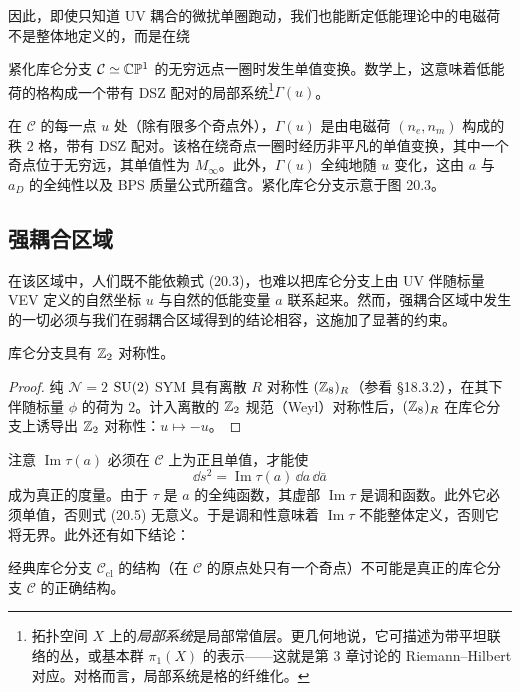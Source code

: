 因此，即使只知道 UV 耦合的微扰单圈跑动，我们也能断定低能理论中的电磁荷不是整体地定义的，而是在绕

紧化库仑分支 $\mathcal{C}\simeq\mathbb{C}\mathbb{P}^1$ 的无穷远点一圈时发生单值变换。数学上，这意味着低能荷的格构成一个带有 DSZ 配对的局部系统\footnote{拓扑空间 $X$ 上的\emph{局部系统}是局部常值层。更几何地说，它可描述为带平坦联络的丛，或基本群 $\pi_1(X)$ 的表示——这就是第 3 章讨论的 Riemann--Hilbert 对应。对格而言，局部系统是格的纤维化。}$\Gamma(u)$。

在 $\mathcal{C}$ 的每一点 $u$ 处（除有限多个奇点外），$\Gamma(u)$ 是由电磁荷 $(n_e,n_m)$ 构成的秩 $2$ 格，带有 DSZ 配对。该格在绕奇点一圈时经历非平凡的单值变换，其中一个奇点位于无穷远，其单值性为 $M_\infty$。此外，$\Gamma(u)$ 全纯地随 $u$ 变化，这由 $a$ 与 $a_D$ 的全纯性以及 BPS 质量公式所蕴含。紧化库仑分支示意于图 20.3。


\subsection{强耦合区域}

在该区域中，人们既不能依赖式 (20.3)，也难以把库仑分支上由 UV 伴随标量 VEV 定义的自然坐标 $u$ 与自然的低能变量 $a$ 联系起来。然而，强耦合区域中发生的一切必须与我们在弱耦合区域得到的结论相容，这施加了显著的约束。

\begin{proposition}[20.5]
库仑分支具有 $\mathbb{Z}_2$ 对称性。
\end{proposition}

\begin{proof}
纯 $\mathcal{N}=2$ $\operatorname{SU}(2)$ SYM 具有离散 $R$ 对称性 $(\mathbb{Z}_8)_R$（参看 §18.3.2），在其下伴随标量 $\phi$ 的荷为 $2$。计入离散的 $\mathbb{Z}_2$ 规范（Weyl）对称性后，$(\mathbb{Z}_8)_R$ 在库仑分支上诱导出 $\mathbb{Z}_2$ 对称性：$u\mapsto-u$。
\end{proof}

注意 $\operatorname{Im}\tau(a)$ 必须在 $\mathcal{C}$ 上为正且单值，才能使
\begin{equation}
\dd s^2=\operatorname{Im}\tau(a)\,\dd a\,\dd\bar a
\tag{20.5}
\end{equation}
成为真正的度量。由于 $\tau$ 是 $a$ 的全纯函数，其虚部 $\operatorname{Im}\tau$ 是调和函数。此外它必须单值，否则式 (20.5) 无意义。于是调和性意味着 $\operatorname{Im}\tau$ 不能整体定义，否则它将无界。此外还有如下结论：

\begin{proposition}[20.6]
经典库仑分支 $\mathcal{C}_{\mathrm{cl}}$ 的结构（在 $\mathcal{C}$ 的原点处只有一个奇点）不可能是真正的库仑分支 $\mathcal{C}$ 的正确结构。
\end{proposition}

